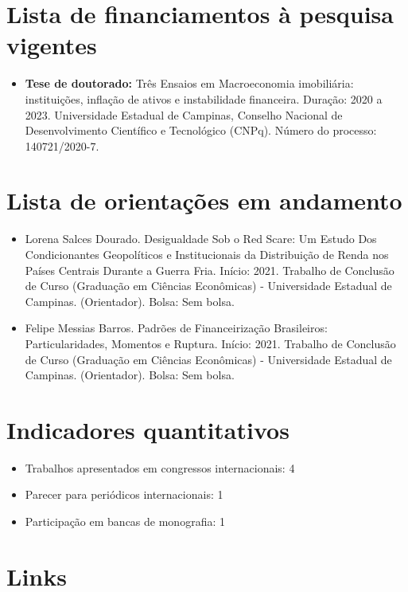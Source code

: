 \documentclass[11pt,a4paper]{article} \usepackage[utf8]{inputenc}
\begin{document}
\section{Lista de financiamentos à pesquisa vigentes}

\begin{itemize}
  \item \textbf{Tese de doutorado:} Três Ensaios em Macroeconomia imobiliária:
		instituições, inflação de ativos e instabilidade financeira. Duração:
		2020 a 2023. Universidade Estadual de Campinas, Conselho Nacional de
		Desenvolvimento Científico e Tecnológico (CNPq). Número do processo:
		140721/2020-7.
\end{itemize}

\section{Lista de orientações em andamento}

\begin{itemize}
  \item Lorena Salces Dourado. Desigualdade Sob o Red Scare: Um Estudo Dos Condicionantes Geopolíticos e Institucionais da Distribuição de Renda nos Países Centrais Durante a Guerra Fria. Início: 2021. Trabalho de Conclusão de Curso (Graduação em
		Ciências Econômicas) - Universidade Estadual de Campinas. (Orientador). Bolsa: Sem bolsa.
  \item Felipe Messias Barros. Padrões de Financeirização Brasileiros: Particularidades, Momentos e Ruptura. Início: 2021. Trabalho de Conclusão de Curso (Graduação em Ciências Econômicas) - Universidade Estadual de Campinas. (Orientador). Bolsa: Sem bolsa.
\end{itemize}

\section{Indicadores quantitativos}

\begin{itemize}
  \item Trabalhos apresentados em congressos internacionais: 4
  \item Parecer para periódicos internacionais: 1
  \item Participação em bancas de monografia: 1
\end{itemize}

\section{Links}
\end{document}
